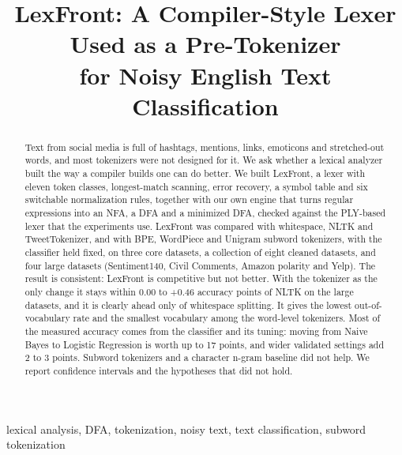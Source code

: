 \documentclass[journal,onecolumn,12pt,a4paper]{IEEEtran}
\begin{document}
\title{LexFront: A Compiler-Style Lexer Used as a Pre-Tokenizer\\for Noisy English Text Classification}
\author{
}
\maketitle

\begin{abstract}
Text from social media is full of hashtags, mentions, links, emoticons and stretched-out words, and most tokenizers were not designed for it. We ask whether a lexical analyzer built the way a compiler builds one can do better. We built LexFront, a lexer with eleven token classes, longest-match scanning, error recovery, a symbol table and six switchable normalization rules, together with our own engine that turns regular expressions into an NFA, a DFA and a minimized DFA, checked against the PLY-based lexer that the experiments use. LexFront was compared with whitespace, NLTK and TweetTokenizer, and with BPE, WordPiece and Unigram subword tokenizers, with the classifier held fixed, on three core datasets, a collection of eight cleaned datasets, and four large datasets (Sentiment140, Civil Comments, Amazon polarity and Yelp). The result is consistent: LexFront is competitive but not better. With the tokenizer as the only change it stays within 0.00 to +0.46 accuracy points of NLTK on the large datasets, and it is clearly ahead only of whitespace splitting. It gives the lowest out-of-vocabulary rate and the smallest vocabulary among the word-level tokenizers. Most of the measured accuracy comes from the classifier and its tuning: moving from Naive Bayes to Logistic Regression is worth up to 17 points, and wider validated settings add 2 to 3 points. Subword tokenizers and a character n-gram baseline did not help. We report confidence intervals and the hypotheses that did not hold.
\end{abstract}

\begin{IEEEkeywords}
lexical analysis, DFA, tokenization, noisy text, text classification, subword tokenization
\end{IEEEkeywords}
\end{document}
